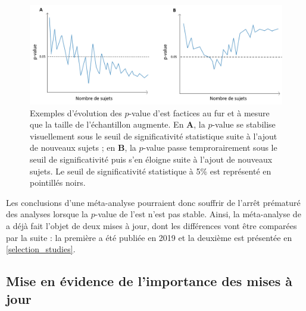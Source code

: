 \begin{figure}[h!]
  \centering
	\includegraphics[width=1\linewidth]{figures/chapter-2/meta-analysis-evolution-p-value-examples} 
  \caption[Exemples d'évolution des $p$-value d'\gls{est} factices au fur et à mesure que la taille de l'échantillon augmente.]
	{Exemples d'évolution des $p$-value d'\gls{est} factices au fur et à mesure que la taille de l'échantillon augmente. 
	En \textbf{A}, la $p$-value se stabilise visuellement sous le seuil de significativité statistique suite à l'ajout de nouveaux sujets ; en \textbf{B}, la $p$-value 
	passe temprorairement sous le seuil de significativité puis s'en éloigne suite à l'ajout de nouveaux sujets. 
	Le seuil de significativité statistique à 5\% est représenté en pointillés noirs.}
  \label{Figure:meta-analysis-evolution-p-value-examples}
\end{figure}

Les conclusions d'une méta-analyse pourraient donc souffrir de l'arrêt prématuré des analyses lorsque la $p$-value de l'\gls{est} n'est pas stable. 
Ainsi, la méta-analyse de \citet{Cortese2016} a déjà fait l'objet de deux mises à jour, dont les différences vont être comparées par la suite : 
la première a été publiée en 2019 \citep{Bussalb2019clinical} et la deuxième est présentée en \ref{selection_studies}. 

\subsection{Mise en évidence de l'importance des mises à jour} \label{methods_importance_to_update_meta_analysis}

